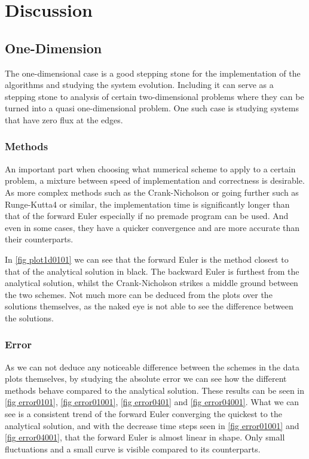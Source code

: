 \documentclass[%
reprint,
nofootinbib,
amsmath,amssymb,
aps,
]{revtex4-1}
\begin{document}
\section{Discussion} %
\subsection{One-Dimension}
The one-dimensional case is a good stepping stone for the implementation of the algorithms and studying the system evolution. Including it can serve as a stepping stone to analysis of certain two-dimensional problems where they can be turned into a quasi one-dimensional problem. One such case is studying systems that have zero flux at the edges. 
\subsubsection{Methods}
An important part when choosing what numerical scheme to apply to a certain problem, a mixture between speed of implementation and correctness is desirable. As more complex methods such as the Crank-Nicholson or going further such as Runge-Kutta4 or similar, the implementation time is significantly longer than that of the forward Euler especially if no premade program can be used. And even in some cases, they have a quicker convergence and are more accurate than their counterparts. 

In \autoref{fig plot1d0101} we can see that the forward Euler is the method closest to that of the analytical solution in black. The backward Euler is furthest from the analytical solution, whilst the Crank-Nicholson strikes a middle ground between the two schemes. 
Not much more can be deduced from the plots over the solutions themselves, as the naked eye is not able to see the difference between the solutions. 
\subsubsection{Error}
As we can not deduce any noticeable difference between the schemes in the data plots themselves, by studying the absolute error we can see how the different methods behave compared to the analytical solution. These results can be seen in \autoref{fig error0101}, \autoref{fig error01001}, \autoref{fig error0401} and \autoref{fig error04001}. What we can see is a consistent trend of the forward Euler converging the quickest to the analytical solution, and with the decrease time steps seen in \autoref{fig error01001} and \autoref{fig error04001}, that the forward Euler is almost linear in shape. 
Only small fluctuations and a small curve is visible compared to its counterparts. 
\end{document}
